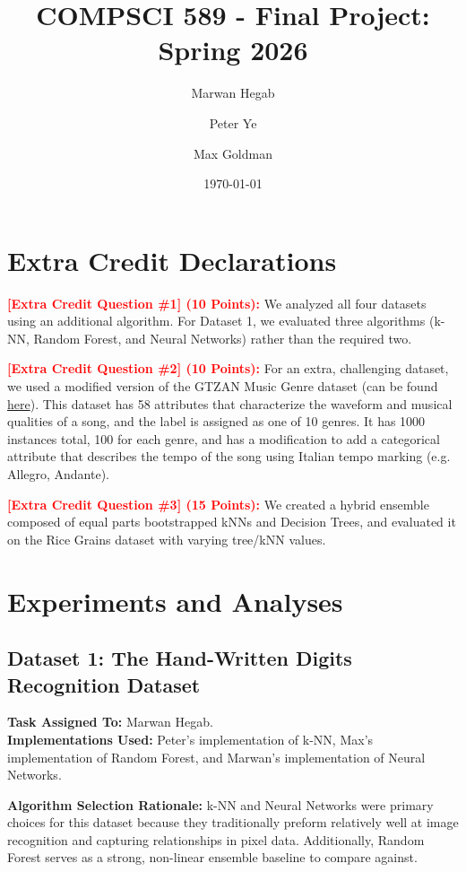 \documentclass{article}
\title{COMPSCI 589 - Final Project: Spring 2026}
\author{Marwan Hegab \and Peter Ye \and Max Goldman}
\date{\today}
\begin{document}
\maketitle

\section*{Extra Credit Declarations}
\textcolor{red}{\textbf{[Extra Credit Question \#1] (10 Points):}} We analyzed all four datasets using an additional algorithm. For Dataset 1, we evaluated three algorithms (k-NN, Random Forest, and Neural Networks) rather than the required two.

\noindent\textcolor{red}{\textbf{[Extra Credit Question \#2] (10 Points):}} For an extra, challenging dataset, we used a modified version of the GTZAN Music Genre dataset (can be found \href{https://www.kaggle.com/datasets/andradaolteanu/gtzan-dataset-music-genre-classification}{here}).
This dataset has 58 attributes that characterize the waveform and musical qualities of a song, and the label is assigned as one of 10 genres. 
It has 1000 instances total, 100 for each genre, and has a modification to add a categorical attribute that describes the tempo of the song using Italian tempo marking (e.g. Allegro, Andante).

\noindent\textcolor{red}{\textbf{[Extra Credit Question \#3] (15 Points):}} We created a hybrid ensemble composed of equal parts bootstrapped kNNs and Decision Trees, and evaluated it on the Rice Grains dataset with varying tree/kNN values.

\section{Experiments and Analyses}

\subsection{Dataset 1: The Hand-Written Digits Recognition Dataset}

\textbf{Task Assigned To:} Marwan Hegab. \\
\textbf{Implementations Used:} Peter's implementation of k-NN, Max's implementation of Random Forest, and Marwan's implementation of Neural Networks.

\textbf{Algorithm Selection Rationale:} k-NN and Neural Networks were primary choices for this dataset because they traditionally preform relatively well at image recognition and capturing relationships in pixel data. Additionally, Random Forest serves as a strong, non-linear ensemble baseline to compare against.
\end{document}
